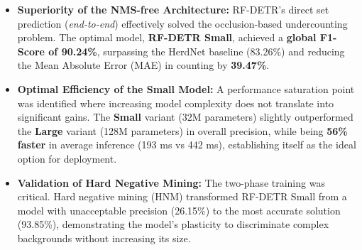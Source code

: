 \begin{itemize}
    \item \textbf{Superiority of the NMS-free Architecture:} RF-DETR's direct set prediction (\textit{end-to-end}) effectively solved the occlusion-based undercounting problem. The optimal model, \textbf{RF-DETR Small}, achieved a \textbf{global F1-Score of 90.24\%}, surpassing the HerdNet baseline (83.26\%) and reducing the Mean Absolute Error (MAE) in counting by \textbf{39.47\%}.

    \item \textbf{Optimal Efficiency of the Small Model:} A performance saturation point was identified where increasing model complexity does not translate into significant gains. The \textbf{Small} variant (32M parameters) slightly outperformed the \textbf{Large} variant (128M parameters) in overall precision, while being \textbf{56\% faster} in average inference (193 ms vs 442 ms), establishing itself as the ideal option for deployment.

    \item \textbf{Validation of Hard Negative Mining:} The two-phase training was critical. Hard negative mining (HNM) transformed RF-DETR Small from a model with unacceptable precision (26.15\%) to the most accurate solution (93.85\%), demonstrating the model's plasticity to discriminate complex backgrounds without increasing its size.


\end{itemize}
